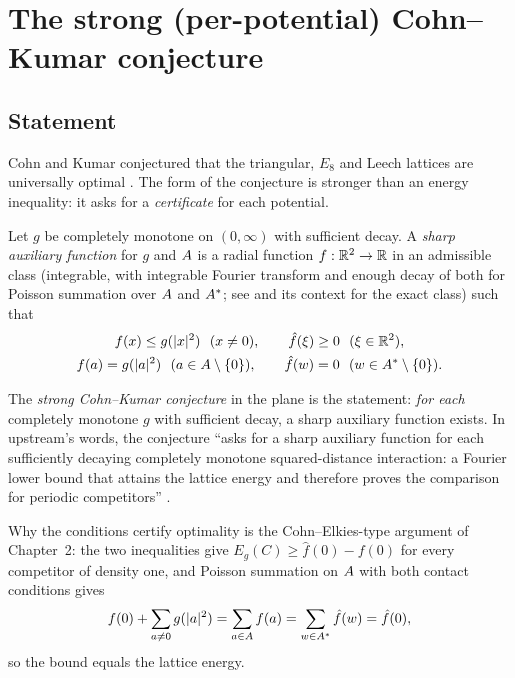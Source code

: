 \section{The strong (per-potential) Cohn--Kumar conjecture}
\label{ch5:sec:ck}

\subsection{Statement}

Cohn and Kumar conjectured that the triangular, $E_8$ and Leech lattices are universally optimal
\cite[Conjecture~9.4]{ck}. The form of the conjecture is stronger than an energy inequality: it asks for a
\emph{certificate} for each potential.

\begin{definition}\label{ch5:def:sharp}
Let $g$ be completely monotone on $(0,\infty)$ with sufficient decay. A \emph{sharp auxiliary function} for $g$ and
$A$ is a radial function $f:\mathbb{R}^2\to\mathbb{R}$ in an admissible class (integrable, with integrable Fourier transform and
enough decay of both for Poisson summation over $A$ and $A^*$; see \cite[Conjecture~9.4]{ck} and its context for the exact class) such
that
\begin{gather*}
f(x)\le g(|x|^2)\ \ (x\ne0),\qquad \hat f(\xi)\ge0\ \ (\xi\in\R^2),\\
f(a)=g(|a|^2)\ \ (a\in\Lat\setminus\{0\}),\qquad \hat f(w)=0\ \ (w\in\Lat^*\setminus\{0\}).
\end{gather*}
\end{definition}

The \emph{strong Cohn--Kumar conjecture} in the plane is the statement: \emph{for each} completely monotone $g$ with
sufficient decay, a sharp auxiliary function exists. \tierL{} In upstream's words, the conjecture ``asks for a sharp
auxiliary function for each sufficiently decaying completely monotone squared-distance interaction: a Fourier lower
bound that attains the lattice energy and therefore proves the comparison for periodic competitors''
\cite[\S1]{oai}.

Why the conditions certify optimality is the Cohn--Elkies-type argument of Chapter~2: the two inequalities give
$E_g(C)\ge\hat f(0)-f(0)$ for every competitor of density one, and Poisson summation on $A$ with both contact
conditions gives
\[
f(0)+\sum_{a\ne0}g(|a|^2)=\sum_{a\in A}f(a)=\sum_{w\in A^*}\hat f(w)=\hat f(0),
\]
so the bound equals the lattice energy.

